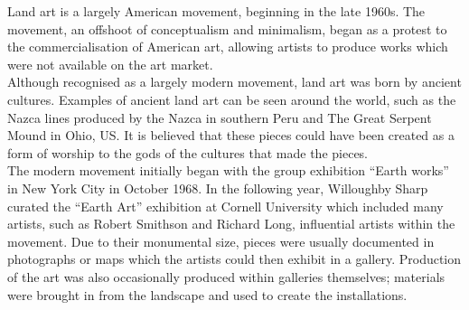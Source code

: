     Land art is a largely American movement, beginning in the late 1960s. The movement, an offshoot of conceptualism and minimalism, began as a protest to the commercialisation of American art, allowing artists to produce works which were not available on the art market.\\
    Although recognised as a largely modern movement, land art was born by ancient cultures. Examples of ancient land art can be seen around the world, such as the Nazca lines produced by the Nazca in southern Peru and The Great Serpent Mound in Ohio, US. It is believed that these pieces could have been created as a form of worship to the gods of the cultures that made the pieces.\\
    The modern movement initially began with the group exhibition ``Earth works'' in New York City in October 1968. In the following year, Willoughby Sharp curated the ``Earth Art'' exhibition at Cornell University which included many artists, such as Robert Smithson and Richard Long, influential artists within the movement. Due to their monumental size, pieces were usually documented in photographs or maps which the artists could then exhibit in a gallery. Production of the art was also occasionally produced within galleries themselves; materials were brought in from the landscape and used to create the installations.\\


